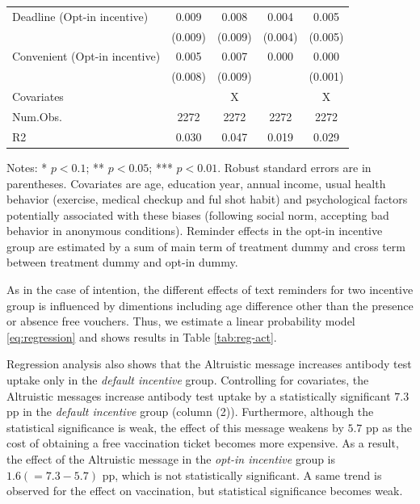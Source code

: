 \documentclass[
]{article}
\begin{document}
\begin{table}
\begin{threeparttable}
\begin{tabular}[t]{lcccc}
\hspace{1em}Deadline (Opt-in incentive) & \num{0.009} & \num{0.008} & \num{0.004} & \num{0.005}\\
\hspace{1em} & (\num{0.009}) & (\num{0.009}) & (\num{0.004}) & (\num{0.005})\\
\hspace{1em}Convenient (Opt-in incentive) & \num{0.005} & \num{0.007} & \num{0.000} & \num{0.000}\\
\hspace{1em} & (\num{0.008}) & (\num{0.009}) &  & (\num{0.001})\\
\midrule
Covariates &  & X &  & X\\
Num.Obs. & \num{2272} & \num{2272} & \num{2272} & \num{2272}\\
R2 & \num{0.030} & \num{0.047} & \num{0.019} & \num{0.029}\\
\bottomrule
\end{tabular}
\begin{tablenotes}
\item Notes: * $p < 0.1$; ** $p < 0.05$; *** $p < 0.01$. Robust standard errors are in parentheses. Covariates are age, education year, annual income, usual health behavior (exercise, medical checkup and ful shot habit) and psychological factors potentially associated with these biases (following social norm, accepting bad behavior in anonymous conditions). Reminder effects in the opt-in incentive group are estimated by a sum of main term of treatment dummy and cross term between treatment dummy and opt-in dummy.
\end{tablenotes}
\end{threeparttable}
\end{table}

As in the case of intention, the different effects of text reminders for two incentive group is influenced by dimentions including age difference other than the presence or absence free vouchers. Thus, we estimate a linear probability model \eqref{eq:regression} and shows results in Table \ref{tab:reg-act}.

Regression analysis also shows that the Altruistic message increases antibody test uptake only in the \emph{default incentive} group. Controlling for covariates, the Altruistic messages increase antibody test uptake by a statistically significant \(7.3\) pp in the \emph{default incentive} group (column (2)). Furthermore, although the statistical significance is weak, the effect of this message weakens by \(5.7\) pp as the cost of obtaining a free vaccination ticket becomes more expensive. As a result, the effect of the Altruistic message in the \emph{opt-in incentive} group is \(1.6 (=7.3-5.7)\) pp, which is not statistically significant. A same trend is observed for the effect on vaccination, but statistical significance becomes weak.
\end{document}
